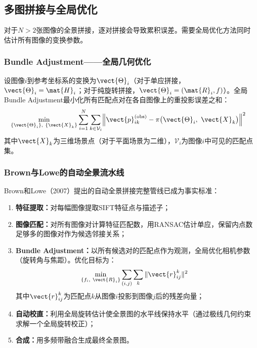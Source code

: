 \subsection{多图拼接与全局优化}
\label{sec:bundle-global}

对于$N > 2$张图像的全景拼接，逐对拼接会导致累积误差。需要全局优化方法同时估计所有图像的变换参数。

\subsubsection{Bundle Adjustment——全局几何优化}

设图像$i$到参考坐标系的变换为$\vect{\Theta}_i$（对于单应拼接，$\vect{\Theta}_i = \mat{H}_i$；对于纯旋转拼接，$\vect{\Theta}_i = (\mat{R}_i, f)$）。全局Bundle Adjustment最小化所有匹配点对在各自图像上的重投影误差之和：
\begin{equation}
\min_{\{\vect{\Theta}_i\},\ \{\vect{X}_k\}}
\sum_{i=1}^{N}\sum_{k \in \mathcal{V}_i}
\Bigl\|\vect{p}_{ik}^{\text{(obs)}} - \pi\bigl(\vect{\Theta}_i,\ \vect{X}_k\bigr)\Bigr\|^2
\label{eq:bundle-adjust}
\end{equation}
其中$\vect{X}_k$为三维场景点（对于平面场景为二维），$\mathcal{V}_i$为图像$i$中可见的匹配点集。

\subsubsection{Brown与Lowe的自动全景流水线}

Brown和Lowe（2007）提出的自动全景拼接完整管线已成为事实标准：

\begin{enumerate}[leftmargin=*]
  \item \textbf{特征提取：}对每幅图像提取SIFT特征点与描述子；
  \item \textbf{图像匹配：}对所有图像对计算特征匹配数，用RANSAC估计单应，保留内点数足够多的图像对作为候选邻接关系；
  \item \textbf{Bundle Adjustment：}以所有候选对的匹配点作为观测，全局优化相机参数（旋转角与焦距）。优化目标为：
  \begin{equation}
  \min_{\{f_i,\ \vect{R}_i\}} \sum_{(i,j)}\sum_{k} \|\vect{r}_{ij}^k\|^2
  \label{eq:brown-ba}
  \end{equation}
  其中$\vect{r}_{ij}^k$为匹配点$k$从图像$i$投影到图像$j$后的残差向量；
  \item \textbf{自动校直：}利用全局旋转估计使全景图的水平线保持水平（通过极线几何约束求解一个全局旋转校正）；
  \item \textbf{合成：}用多频带融合生成最终全景图。
\end{enumerate}

